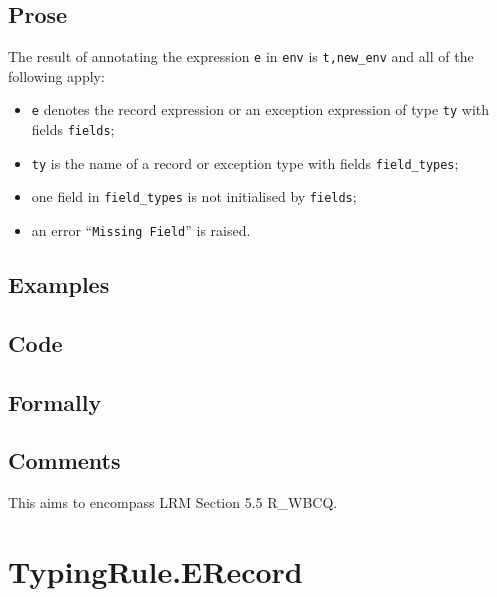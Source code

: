 \documentclass{book}
\begin{document}
  \subsection{Prose}
  The result of annotating the expression \texttt{e} in \texttt{env} is
\texttt{t,new\_env} and all of the following apply:
  \begin{itemize}
  \item \texttt{e} denotes the record expression or an exception expression of type \texttt{ty} with fields \texttt{fields};
  \item \texttt{ty} is the name of a record or exception type with fields \texttt{field\_types};
  \item one field in \texttt{field\_types} is not initialised by \texttt{fields};
  \item an error ``\texttt{Missing Field}'' is raised.
  \end{itemize}

  \subsection{Examples}

  \subsection{Code}

  \subsection{Formally}

  \subsection{Comments}
  This aims to encompass LRM Section 5.5 R\_WBCQ.

\section{TypingRule.ERecord \label{sec:TypingRule.ERecord}}
\end{document}
